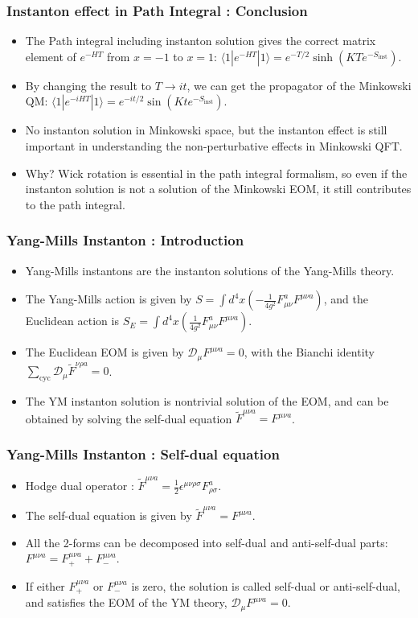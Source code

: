 \documentclass[10pt]{beamer}
\begin{document}
\begin{frame}
\frametitle{Instanton effect in Path Integral : Conclusion}
\begin{itemize}
\item The Path integral including instanton solution gives the correct matrix element of $e^{-HT}$ from $x = -1$ to $x = 1$: $\langle 1 | e^{-HT} | 1 \rangle = e^{-T/2} \sinh(KTe^{-S_{\text{inst}}})$.
\item By changing the result to $T \rightarrow it$, we can get the propagator of the Minkowski QM: $\langle 1 | e^{-iHT} | 1 \rangle = e^{-it/2} \sin(Kte^{-S_{\text{inst}}})$.
\item No instanton solution in Minkowski space, but the instanton effect is still important in understanding the non-perturbative effects in Minkowski QFT.
\item Why? Wick rotation is essential in the path integral formalism, so even if the instanton solution is not a solution of the Minkowski EOM, it still contributes to the path integral.

\end{itemize}
\end{frame}
\begin{frame}
\frametitle{Yang-Mills Instanton : Introduction}
\begin{itemize}
\item Yang-Mills instantons are the instanton solutions of the Yang-Mills theory.
\item The Yang-Mills action is given by $S = \int d^4x \left(-\frac{1}{4g^2}F_{\mu\nu}^a F^{\mu\nu a}\right)$, and the Euclidean action is $S_E = \int d^4x \left(\frac{1}{4g^2}F_{\mu\nu}^a F^{\mu\nu a}\right)$.
\item The Euclidean EOM is given by $\mathcal{D}_\mu F^{\mu\nu a} = 0$, with the Bianchi identity $\sum_{\text{cyc}}\mathcal{D}_\mu \tilde{F}^{\nu\rho a} = 0$.
\item The YM instanton solution is nontrivial solution of the EOM, and can be obtained by solving the self-dual equation $\tilde{F}^{\mu\nu a} = F^{\mu\nu a}$.
\end{itemize}
\end{frame}

\begin{frame}
    \frametitle{Yang-Mills Instanton : Self-dual equation}
    \begin{itemize}
    \item Hodge dual operator : $\tilde{F}^{\mu\nu a} = \frac{1}{2}\epsilon^{\mu\nu\rho\sigma}F_{\rho\sigma}^a$.
    \item The self-dual equation is given by $\tilde{F}^{\mu\nu a} = F^{\mu\nu a}$.
    \item All the 2-forms can be decomposed into self-dual and anti-self-dual parts: $F^{\mu\nu a} = F^{\mu\nu a}_+ + F^{\mu\nu a}_-$.
    \item If either $F^{\mu\nu a}_+$ or $F^{\mu\nu a}_-$ is zero, the solution is called self-dual or anti-self-dual, and satisfies the EOM of the YM theory, $\mathcal{D}_\mu F^{\mu\nu a} = 0$.
    \end{itemize}
    \end{frame}
\end{document}
